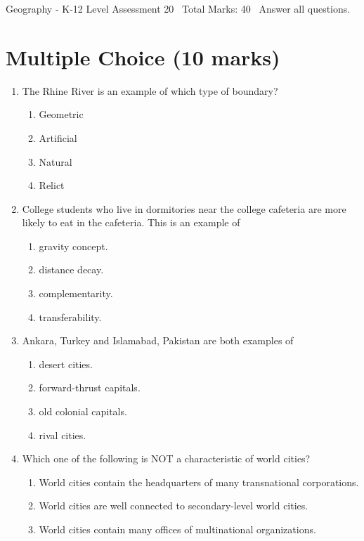 \documentclass[12pt]{article}
\begin{document}
\begin{center}
Geography - K-12 Level Assessment 20 \
Total Marks: 40 \
Answer all questions.
\end{center}

\section*{Multiple Choice (10 marks)}
\begin{enumerate}[label=\arabic*.]
\item The Rhine River is an example of which type of boundary?
\begin{enumerate}[label=(\alph*)]
    \item Geometric
    \item Artificial
    \item Natural
    \item Relict
\end{enumerate}
\item College students who live in dormitories near the college cafeteria are more likely to eat in the cafeteria. This is an example of
\begin{enumerate}[label=(\alph*)]
    \item gravity concept.
    \item distance decay.
    \item complementarity.
    \item transferability.
\end{enumerate}
\item Ankara, Turkey and Islamabad, Pakistan are both examples of
\begin{enumerate}[label=(\alph*)]
    \item desert cities.
    \item forward-thrust capitals.
    \item old colonial capitals.
    \item rival cities.
\end{enumerate}
\item Which one of the following is NOT a characteristic of world cities?
\begin{enumerate}[label=(\alph*)]
    \item World cities contain the headquarters of many transnational corporations.
    \item World cities are well connected to secondary-level world cities.
    \item World cities contain many offices of multinational organizations.

\end{enumerate}
\end{enumerate}
\end{document}
